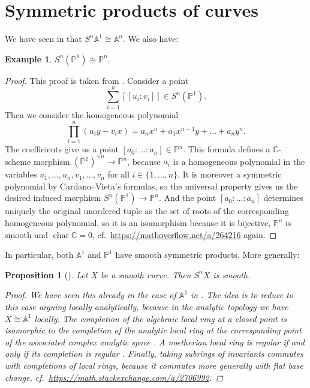 \documentclass[12pt,a4paper]{amsart}
\theoremstyle{plain}
\newtheorem{prop}[thm]{Proposition}
\theoremstyle{definition}
\newtheorem{exmp}[thm]{Example}
\theoremstyle{remark}
\begin{document}
\section{Symmetric products of curves}

We have seen in  that $S^{n}\mathbb{A}^{1} \cong \mathbb{A}^{n}$.
We also have:

\begin{exmp}\label{exmp:projectiveline}
  $S^{n}(\mathbb{P}^{1}) \cong \mathbb{P}^{n}$.

  \begin{proof}
    This proof is taken from \cite[Example 3.4]{rot16}.
    Consider a point
    \[ \sum_{i = 1}^{n} [[u_{i}:v_{i}]] \in S^{n}(\mathbb{P}^{1}). \]
    Then we consider the homogeneous polynomial
    \[ \prod_{i = 1}^{n} (u_{i}y - v_{i}x) = a_{n} x^{n} + a_{1} x^{n-1}y + \ldots + a_{n}y^{n}. \]
    The coefficients give us a point $[a_{0} : \ldots : a_{n} ] \in \mathbb{P}^{n}$.
    This formula defines a $\mathbb{C}$-scheme morphism $(\mathbb{P}^{1})^{\times n} \to \mathbb{P}^{n}$, because $a_{i}$ is a homogeneous polynomial in the variables $u_{1}, \ldots, u_{n}, v_{1}, \ldots, v_{n}$ for all $i \in \{ 1 , \ldots, n\}$.
    It is moreover a symmetric polynomial by Cardano--Vieta's formulas, so the universal property gives us the desired induced morphism $S^{n}(\mathbb{P}^{1}) \to \mathbb{P}^{n}$.
    And the point $[a_{0} : \ldots : a_{n}]$ determines uniquely the original unordered tuple as the set of roots of the corresponding homogeneous polynomial, so it is an isomorphism because it is bijective, $\mathbb{P}^{n}$ is smooth and $\operatorname{char}{\mathbb{C}} = 0$, cf.~\url{https://mathoverflow.net/a/264216} again.
  \end{proof}
\end{exmp}

In particular, both $\mathbb{A}^{1}$ and $\mathbb{P}^{1}$ have smooth symmetric products.
More generally:

\begin{prop}[{\cite[Proposition 3.1]{rot16}}]\label{prop:curves}
  Let $X$ be a smooth curve.
  Then $S^{n}X$ is smooth.

  \begin{proof}
    We have seen this already in the case of $\mathbb{A}^{1}$ in .
    The idea is to reduce to this case arguing locally analytically, because in the analytic topology we have $X \cong \mathbb{A}^{1}$ locally.
    The completion of the algebraic local ring at a closed point is isomorphic to the completion of the analytic local ring at the corresponding point of the associated complex analytic space \cite[Proposition 3]{ser56}.
    A noetherian local ring is regular if and only if its completion is regular \cite[\href{https://stacks.math.columbia.edu/tag/07NY}{Tag 07NY}]{stacks-project}.
    Finally, taking subrings of invariants commutes with completions of local rings, because it commutes more generally with flat base change, cf.~\url{https://math.stackexchange.com/a/2706992}.
  \end{proof}
\end{prop}
\end{document}
